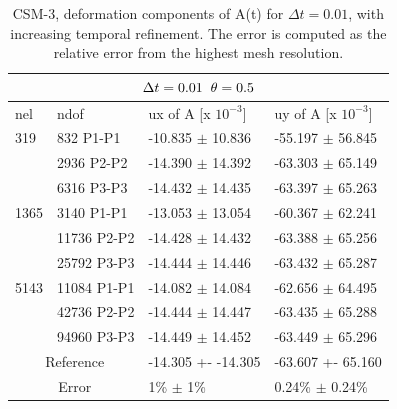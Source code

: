 \begin{table}[h!]
\centering
\begin{tabular}{ |p{1cm}||p{2.7cm}|p{3.3cm}|p{3.3cm}|}
\hline
  \multicolumn{4}{|c|}{$\Delta t = 0.01 \hspace{2mm} \theta = 0.5$} \\
\hline
nel & ndof & ux of A [x $10^{-3}$]  &uy of A [x $10^{-3}$] \\
\hline
    319     & 832 P1-P1 & -10.835       $\pm$   10.836 & -55.197    $\pm$  56.845 \\
     & 2936 P2-P2 & -14.390       $\pm$   14.392 & -63.303      $\pm$   65.149 \\
      & 6316 P3-P3& -14.432      $\pm$   14.435 & -63.397   $\pm$   65.263 \\
    \hline
    1365    & 3140 P1-P1  & -13.053     $\pm$   13.054 & -60.367      $\pm$ 62.241 \\
     & 11736 P2-P2  & -14.428       $\pm$  14.432 & -63.388   $\pm$   65.256 \\
     & 25792 P3-P3  & -14.444      $\pm$   14.446 & -63.432    $\pm$   65.287 \\
     \hline
     5143    & 11084 P1-P1 & -14.082       $\pm$  14.084 & -62.656   $\pm$   64.495 \\
     & 42736 P2-P2 & -14.444     $\pm$  14.447 & -63.435   $\pm$   65.288 \\
     & 94960 P3-P3& -14.449      $\pm$  14.452 & -63.449    $\pm$   65.296 \\
 \hline
  \multicolumn{2}{|c|}{Reference}  &-14.305 +- -14.305        & -63.607 +- 65.160    \\
   \hline
    \multicolumn{2}{|c|}{Error}  & 1\% $\pm$ 1\%   & 0.24\% $\pm$ 0.24\%\\
   \hline
\end{tabular}
\caption{CSM-3, deformation components of A(t) for $\Delta t = 0.01$, with increasing temporal refinement. The error is computed as the relative error from the highest mesh resolution.}
\label{table:csm31}
\end{table}
